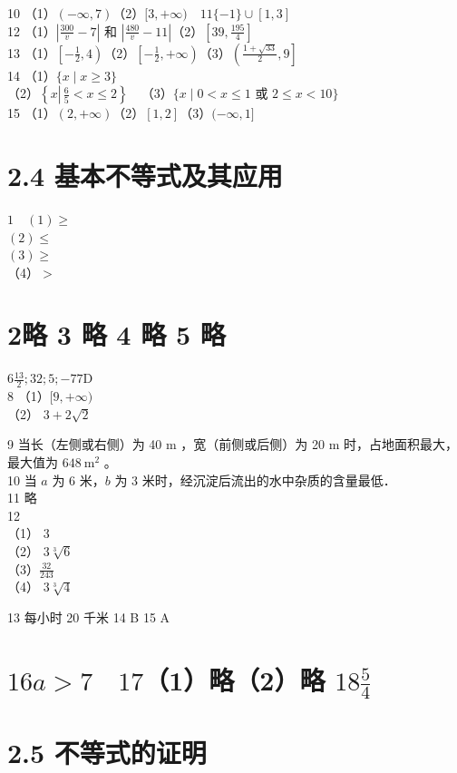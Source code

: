 \documentclass[10pt]{article}
\begin{document}
10 （1）\((-\infty, 7)\)（2）\([3,+\infty) \quad 11\{-1\} \cup[1,3]\)\\
12 （1）\(\left|\frac{300}{v}-7\right|\) 和 \(\left|\frac{480}{v}-11\right|\)（2）\(\left[39, \frac{195}{4}\right]\)\\
13 （1）\(\left[-\frac{1}{2}, 4\right)\)（2）\(\left[-\frac{1}{2},+\infty\right)\)（3）\(\left(\frac{1+\sqrt{33}}{2}, 9\right]\)\\
14 （1）\(\{x \mid x \geqslant 3\}\)\\
（2）\(\left\{x \left\lvert\, \frac{6}{5}<x \leqslant 2\right.\right\} \quad\)（3）\(\{x \mid 0<x \leqslant 1\) 或 \(2 \leqslant x<10\}\)\\
15 （1）\((2,+\infty)\)（2）\([1,2]\)（3）\((-\infty, 1]\)

\section*{2.4 基本不等式及其应用}
\(1 \quad(1) \geqslant\)\\
\((2) \leqslant\)\\
\((3) \geqslant\)\\
（4）\(>\)

\section*{2略 3 略 4 略 5 略}
\(6 \frac{13}{2} ; 32 ; 5 ;-77 \mathrm{D}\)\\
8 （1）\([9,+\infty)\)\\
（2） \(3+2 \sqrt{2}\)

9 当长（左侧或右侧）为 40 m ，宽（前侧或后侧）为 20 m 时，占地面积最大，最大值为 \(648 \mathrm{~m}^{2}\) 。\\
10 当 \(a\) 为 6 米，\(b\) 为 3 米时，经沉淀后流出的水中杂质的含量最低．\\
11 略\\
12\\
（1） 3\\
（2） \(3 \sqrt[3]{6}\)\\
（3）\(\frac{32}{243}\)\\
（4） \(3 \sqrt[3]{4}\)

13 每小时 20 千米 14 B 15 A

\section*{\(16 a>7 \quad 17\)（1）略（2）略 \(18 \frac{5}{4}\)}
\section*{2.5 不等式的证明}
\end{document}
